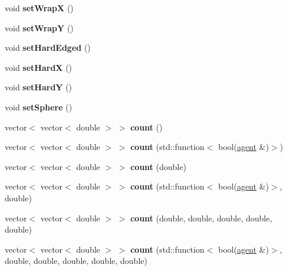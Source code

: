 \begin{DoxyCompactItemize}
void {\bfseries set\+WrapX} ()
\item 
\mbox{\label{classsearchGrid_ab2f7ffa1bade8bef49b309fe9c712f7a}} 
void {\bfseries set\+WrapY} ()
\item 
\mbox{\label{classsearchGrid_a962c2bc9e5faa1de1f93f97f9bff73f2}} 
void {\bfseries set\+Hard\+Edged} ()
\item 
\mbox{\label{classsearchGrid_ad5844f3b10d406c6597a9fce210542fa}} 
void {\bfseries set\+HardX} ()
\item 
\mbox{\label{classsearchGrid_a574631ef7a30ee6e6014c6b244c0bedf}} 
void {\bfseries set\+HardY} ()
\item 
\mbox{\label{classsearchGrid_a6eeb1f5f0b71d3fd42b2e46e05ef6aee}} 
void {\bfseries set\+Sphere} ()
\item 
\mbox{\label{classsearchGrid_a5fbfb6aebb21878babbea169ca349da6}} 
vector$<$ vector$<$ double $>$ $>$ {\bfseries count} ()
\item 
\mbox{\label{classsearchGrid_a72b400c83b39a057dda2b5674096426a}} 
vector$<$ vector$<$ double $>$ $>$ {\bfseries count} (std\+::function$<$ bool(\mbox{\hyperlink{classagent}{agent}} \&)$>$)
\item 
\mbox{\label{classsearchGrid_a4a30a4f8ad6869b2545cce4c4302da97}} 
vector$<$ vector$<$ double $>$ $>$ {\bfseries count} (double)
\item 
\mbox{\label{classsearchGrid_ad1017a47c18bbd7629de91fa95fe9b25}} 
vector$<$ vector$<$ double $>$ $>$ {\bfseries count} (std\+::function$<$ bool(\mbox{\hyperlink{classagent}{agent}} \&)$>$, double)
\item 
\mbox{\label{classsearchGrid_ac89f7b99e981208fca229f14b8adf158}} 
vector$<$ vector$<$ double $>$ $>$ {\bfseries count} (double, double, double, double, double)
\item 
\mbox{\label{classsearchGrid_a6275b77b36feced1a3c9d0cc4e5c2a65}} 
vector$<$ vector$<$ double $>$ $>$ {\bfseries count} (std\+::function$<$ bool(\mbox{\hyperlink{classagent}{agent}} \&)$>$, double, double, double, double, double)

\end{DoxyCompactItemize}
